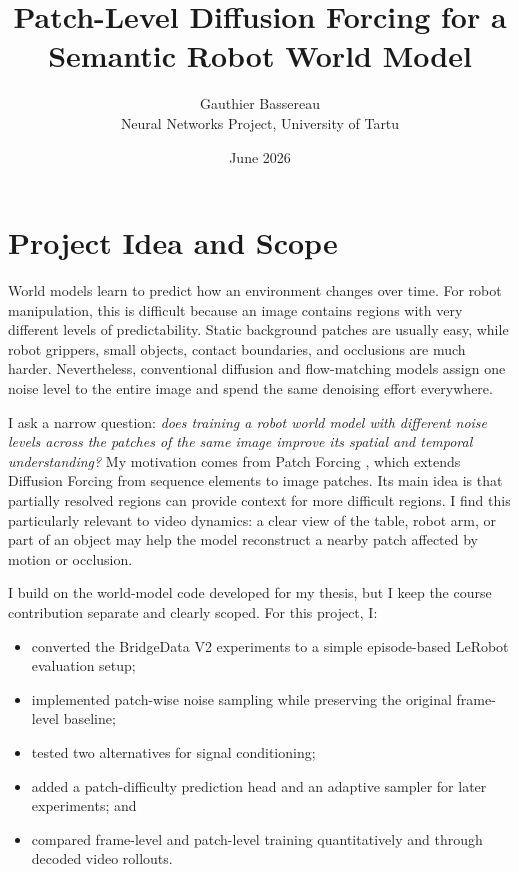 \documentclass[10pt,a4paper]{article}
\title{\vspace{-1.5cm}\textbf{Patch-Level Diffusion Forcing for a Semantic Robot World Model}}
\author{Gauthier Bassereau\\
\small Neural Networks Project, University of Tartu}
\date{June 2026}
\begin{document}
\maketitle
\vspace{-0.8cm}

\section{Project Idea and Scope}

World models learn to predict how an environment changes over time. For robot manipulation, this is difficult because an image contains regions with very different levels of predictability. Static background patches are usually easy, while robot grippers, small objects, contact boundaries, and occlusions are much harder. Nevertheless, conventional diffusion and flow-matching models assign one noise level to the entire image and spend the same denoising effort everywhere.

I ask a narrow question: \emph{does training a robot world model with different noise levels across the patches of the same image improve its spatial and temporal understanding?} My motivation comes from Patch Forcing \cite{schusterbauer2026patch}, which extends Diffusion Forcing \cite{chen2024diffusionforcing} from sequence elements to image patches. Its main idea is that partially resolved regions can provide context for more difficult regions. I find this particularly relevant to video dynamics: a clear view of the table, robot arm, or part of an object may help the model reconstruct a nearby patch affected by motion or occlusion.

I build on the world-model code developed for my thesis, but I keep the course contribution separate and clearly scoped. For this project, I:
\begin{itemize}
    \item converted the BridgeData V2 experiments to a simple episode-based LeRobot evaluation setup;
    \item implemented patch-wise noise sampling while preserving the original frame-level baseline;
    \item tested two alternatives for signal conditioning;
    \item added a patch-difficulty prediction head and an adaptive sampler for later experiments; and
    \item compared frame-level and patch-level training quantitatively and through decoded video rollouts.
\end{itemize}
\end{document}
